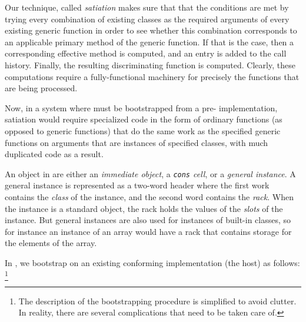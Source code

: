 Our technique, called \emph{satiation} makes sure that that the
conditions are met by trying every combination of existing classes as
the required arguments of every existing generic function in order to
see whether this combination corresponds to an applicable primary
method of the generic function.  If that is the case, then a
corresponding effective method is computed, and an entry is added to
the call history.  Finally, the resulting discriminating function is
computed.  Clearly, these computations require a fully-functional
machinery for precisely the functions that are being processed. 

Now, in a system where \clos{} must be bootstrapped from a pre-\clos{}
implementation, satiation would require specialized code in the form
of ordinary functions (as opposed to generic functions) that do the
same work as the specified generic functions on arguments that are
instances of specified classes, with much duplicated code as a result.

An object in \sicl{} are either an \emph{immediate object}, a
\emph{\texttt{cons} cell}, or a \emph{general instance}.  A general
instance is represented as a two-word header where the first work
contains the \emph{class} of the instance, and the second word
contains the \emph{rack}.  When the instance is a standard object, the
rack holds the values of the \emph{slots} of the instance.  But
general instances are also used for instances of built-in classes, so
for instance an instance of an array would have a rack that contains
storage for the elements of the array. 

In \sicl{}, we bootstrap \clos{} on an existing conforming \cl{}
implementation (the host) as follows:%
\footnote{The description of the bootstrapping procedure is simplified
  to avoid clutter.  In reality, there are several complications that
  need to be taken care of.}

